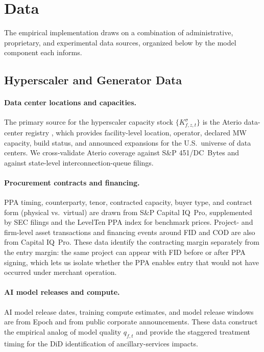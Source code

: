 \documentclass[12pt,letterpaper]{article}
\begin{document}
\section{Data}
\label{sec:data}

The empirical implementation draws on a combination of administrative,
proprietary, and experimental data sources, organized below by the model
component each informs.

\subsection{Hyperscaler and Generator Data}

\paragraph{Data center locations and capacities.} The primary source for
the hyperscaler capacity stock $\{K_{f,z,t}^\sigma\}$ is the Aterio
data-center registry \citep{aterio_us_data_centers_2025}, which provides
facility-level location, operator, declared MW capacity, build status, and
announced expansions for the U.S.\ universe of data centers. We
cross-validate Aterio coverage against S\&P 451/DC~Bytes and against
state-level interconnection-queue filings.

\paragraph{Procurement contracts and financing.} PPA timing, counterparty,
tenor, contracted capacity, buyer type, and contract form (physical vs.\
virtual) are drawn from S\&P Capital IQ~Pro, supplemented by SEC filings and
the LevelTen PPA index for benchmark prices. Project- and firm-level asset
transactions and financing events around FID and COD are also from Capital
IQ~Pro. These data identify the contracting margin separately from the
entry margin: the same project can appear with FID before or after PPA
signing, which lets us isolate whether the PPA enables entry that would
not have occurred under merchant operation.

\paragraph{AI model releases and compute.} AI model release dates, training
compute estimates, and model release windows are from Epoch and from
public corporate announcements. These data construct the empirical analog
of model quality $q_{f,t}$ and provide the staggered treatment timing for
the DiD identification of ancillary-services impacts.
\end{document}
